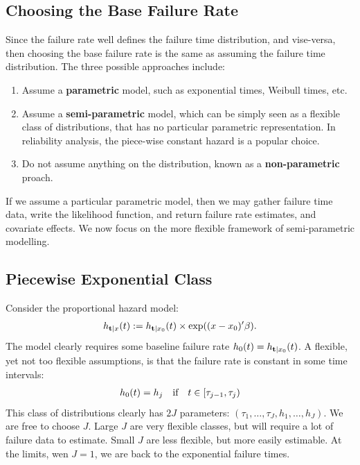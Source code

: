 \subsection{Choosing the Base Failure Rate}
Since the failure rate well defines the failure time distribution, and vise-versa, then choosing the base failure rate is the same as assuming the failure time distribution.
The three possible approaches include:
\begin{enumerate}
\item Assume a \textbf{parametric} model, such as exponential times, Weibull times, etc.
\item Assume a \textbf{semi-parametric} model, which can be simply seen as a flexible class of distributions, that has no particular parametric representation. In reliability analysis, the piece-wise constant hazard is a popular choice.
\item Do not assume anything on the distribution, known as a \textbf{non-parametric} proach. 
\end{enumerate}
If we assume a particular parametric model, then we may gather failure time data, write the likelihood function, and return failure rate estimates, and covariate effects.
We now focus on the more flexible framework of semi-parametric modelling.



\subsection{Piecewise Exponential Class}
Consider the proportional hazard model:
\begin{align}
	h_{\mathbf{t}|x} (t):=h_{\mathbf{t}|x_0} (t) \times \exp((x-x_0)'\beta).
\end{align}
The model clearly requires some baseline failure rate $h_{0} (t)=h_{\mathbf{t}|x_0} (t)$.
A flexible, yet not too flexible assumptions, is that the failure rate is constant in some time intervals:
\begin{align}
	h_{0} (t)=h_j \quad \text{if} \quad t\in [\tau_{j-1},\tau_j)
\end{align}
This class of distributions clearly has $2J$ parameters: $(\tau_1,\dots,\tau_J,h_1,\dots,h_J)$.
We are free to choose $J$. Large $J$ are very flexible classes, but will require a lot of failure data to estimate.
Small $J$ are less flexible, but more easily estimable. At the limits, wen $J=1$, we are back to the exponential failure times. 

